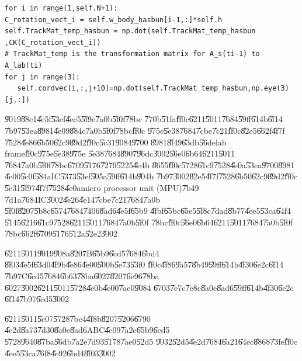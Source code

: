 \begin{verbatim}
for i in range(1,self.N+1):
C_rotation_vect_i = self.w_body_hasbun[i-1,:]*self.h
self.TrackMat_temp_hasbun = np.dot(self.TrackMat_temp_hasbun
,CK(C_rotation_vect_i))
# TrackMat_temp is the transformation matrix for A_s(ti-1) to A_lab(ti)
for j in range(3):
   self.cordvec[i,:,j+10]=np.dot(self.TrackMat_temp_hasbun,np.eye(3)[j,:])
\end{verbatim}

\U{9019}\U{88e1}\U{4e5f}\U{53ef}\U{4ee5}\U{5f9e}\U{7a0b}\U{5f0f}\U{78bc}%
\U{770b}\U{51fa}\U{ff0c}\U{6211}\U{5011}\U{7684}\U{59ff}\U{614b}\U{6f14}%
\U{7b97}\U{53ea}\U{8981}\U{4e09}\U{884c}\U{7a0b}\U{5f0f}\U{78bc}\U{ff0c}%
\U{975e}\U{5e38}\U{7684}\U{7cbe}\U{7c21}\U{ff0c}\U{82e5}\U{662f}\U{4f7f}%
\U{7528}\U{4e86}\U{6b50}\U{62c9}\U{89d2}\U{ff0c}\U{5c31}\U{9084}\U{9700}%
\U{8981}\U{8f49}\U{63db}\U{56de}lab frame\U{ff0c}\U{975e}\U{5e38}\U{975e}%
\U{5e38}\U{7684}\U{8907}\U{96dc}\U{3002}\U{56e0}\U{6b64}\U{6211}\U{5011}%
\U{7684}\U{7a0b}\U{5f0f}\U{78bc}\U{6709}\U{5176}\U{7279}\U{5225}\U{4e4b}%
\U{8655}\U{ff0c}\U{5728}\U{61c9}\U{7528}\U{4e0a}\U{53ea}\U{9700}\U{8981}%
\U{4e00}\U{5c0f}\U{584a}IC\U{5373}\U{53ef}\U{505a}\U{59ff}\U{614b}\U{904b}%
\U{7b97}\U{3002}\U{82e5}\U{4f7f}\U{7528}\U{6b50}\U{62c9}\U{89d2}\U{ff0c}%
\U{5c31}\U{5f97}\U{4f7f}\U{7528}\U{4e0a}micro processor unit (MPU)\U{7b49}%
\U{7d1a}\U{7684}IC\U{3002}\U{4e26}\U{4e14}\U{7cbe}\U{7c21}\U{7684}\U{7a0b}%
\U{5f0f}\U{8207}\U{5b8c}\U{6574}\U{7684}\U{7406}\U{8ad6}\U{4e5f}\U{65b9}%
\U{4fbf}\U{65bc}\U{65e5}\U{5f8c}\U{7dad}\U{8b77}\U{4ee5}\U{53ca}\U{64f4}%
\U{5145}\U{6216}\U{61c9}\U{7528}\U{6211}\U{5011}\U{7684}\U{7a0b}\U{5f0f}%
\U{78bc}\U{ff0c}\U{56e0}\U{6b64}\U{6211}\U{5011}\U{7684}\U{7a0b}\U{5f0f}%
\U{78bc}\U{662f}\U{6709}\U{5176}\U{512a}\U{52e2}\U{3002}

\U{6211}\U{5011}\U{9019}\U{908a}\U{8207}B\U{65b9}\U{6cd5}\U{7684}\U{6bd4}%
\U{8f03}\U{4e5f}\U{63d0}\U{4f9b}\U{4e86}\U{4e00}\U{500b}\U{5e73}\U{53f0}%
\U{ff0c}\U{4f86}\U{9a57}\U{8b49}\U{59ff}\U{614b}\U{4f30}\U{6e2c}\U{6f14}%
\U{7b97}C\U{6cd5}\U{7684}\U{6b63}\U{78ba}\U{6027}\U{8207}\U{6e96}\U{78ba}%
\U{6027}\U{3002}\U{6211}\U{5011}\U{5728}\U{4e0b}\U{4e00}\U{7ae0}\U{9084}%
\U{6703}\U{7e7c}\U{7e8c}\U{8a0e}\U{8ad6}\U{59ff}\U{614b}\U{4f30}\U{6e2c}%
\U{6f14}\U{7b97}\U{6cd5}\U{3002}

\bigskip

\U{6211}\U{5011}\U{5c07}\U{5728}\U{7bc4}\U{4f8b}\U{8207}\U{5206}\U{6790}%
\U{4e2d}\U{8a73}\U{7d30}\U{8a0e}\U{8ad6}ABC\U{4e09}\U{7a2e}\U{65b9}\U{6cd5}%
\U{5728}\U{9640}\U{87ba}\U{56db}\U{7a2e}\U{7d93}\U{5178}\U{7ae0}\U{52d5}%
\U{9032}\U{52d5}\U{4e2d}\U{7684}\U{6a21}\U{64ec}\U{8868}\U{73fe}\U{ff0c}%
\U{4ee5}\U{53ca}\U{76f8}\U{4e92}\U{6bd4}\U{8f03}\U{3002}

